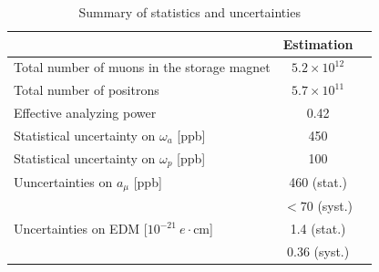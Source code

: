 \begin{table}[t]
  \caption{Summary of statistics and uncertainties}
  \label{tab:sensitivity}
  \begin{center}
  \begin{tabular}{|p{}|c|c}
  \hline
          & Estimation \\
    \hline
    \hline
    Total number of muons in the storage magnet & $5.2 \times 10^{12}$ \\
    Total number of positrons &  $5.7\times 10^{11}$ \\
    Effective analyzing power &  0.42 \\
    \hline
    Statistical uncertainty on $\omega_{a}$ [ppb]  &  450 \\
    Statistical uncertainty on $\omega_{p}$ [ppb]  &  100 \\
    \hline
    Uuncertainties on $a_{\mu}$ [ppb]  & 460 (stat.) \\ 
                                                            & $<70$ (syst.) \\
    \hline
    Uncertainties on EDM [$10^{-21}~e\cdot$cm]  & 1.4 (stat.) \\
                                                                              & 0.36 (syst.) \\
    \hline
  \end{tabular}
  \end{center}
\end{table}

